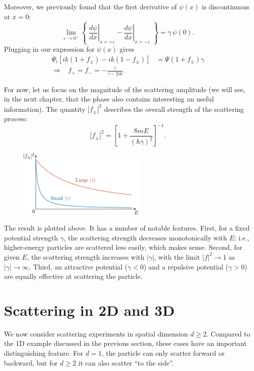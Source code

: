 \documentclass[pra,12pt]{revtex4}
\begin{document}
Moreover, we previously found that the first derivative of $\psi(x)$
is discontinuous at $x=0$:
$$\lim_{\varepsilon\rightarrow 0^+} \left\{\; \left.\frac{d\psi}{dx}\right|_{x = +\varepsilon} - \left.\frac{d\psi}{dx}\right|_{x = -\varepsilon}\; \right\}  =  \gamma\, \psi(0).$$
Plugging in our expression for $\psi(x)$ gives
$$\begin{aligned}\Psi_i\left[ik(1+f_\pm) - ik(1-f_\pm)\right]  &=  \Psi(1+f_\pm) \gamma \\ \Rightarrow \;\;\; f_+ = f_- = -\frac{\gamma}{\gamma - 2ik}.\end{aligned}$$

For now, let us focus on the magnitude of the scattering amplitude (we
will see, in the next chapter, that the phase also contains
interesting an useful information).  The quantity $|f_\pm|^2$
describes the overall strength of the scattering process:
$$|f_\pm|^2 = \left[1 + \frac{8mE}{(\hbar\gamma)^2}\right]^{-1}.$$

\begin{figure}[h]
  \centering\includegraphics[width=0.55\textwidth]{scattering1df}
\end{figure}

The result is plotted above.  It has a number of notable features.
First, for a fixed potential strength $\gamma$, the scattering
strength decreases monotonically with $E$; i.e., higher-energy
particles are scattered less easily, which makes sense.  Second, for
given $E$, the scattering strength increases with $|\gamma|$, with the
limit $|f|^2 \rightarrow 1$ as $|\gamma|\rightarrow \infty$.  Third,
an attractive potential ($\gamma < 0$) and a repulsive potential
($\gamma > 0$) are equally effective at scattering the particle.

\section{Scattering in 2D and 3D}
\label{sec:2d3d_scattering}

We now consider scattering experiments in spatial dimension $d \ge 2$.
Compared to the 1D example discussed in the previous section, these
cases have an important distinguishing feature.  For $d = 1$, the
particle can only scatter forward or backward, but for $d \ge 2$ it
can also scatter ``to the side''.
\end{document}
